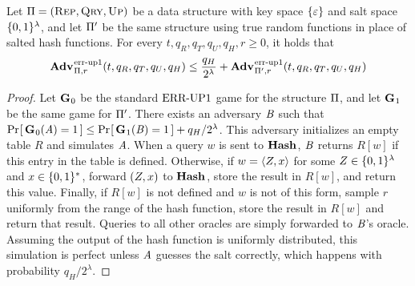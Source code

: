 \begin{lemma}\label{lemma:salttorand}
  Let $\mathrm{\Pi} = (\textsc{Rep}, \textsc{Qry}, \textsc{Up})$ be a data structure with key space $\{\varepsilon\}$ and salt space $\{0,1\}^\lambda$, and let $\mathrm{\Pi}'$ be the same structure using true random functions in place of salted hash functions. For every $t, q_R, q_T, q_U, q_H, r \geq 0$, it holds that
  \[
    \Adv{\errep1}_{\struct,r}(t, q_R, q_T, q_U, q_H) \leq \frac{q_H}{2^\lambda} + \Adv{\errep1}_{\struct',r}(t, q_R, q_T, q_U, q_H)
  \]
\end{lemma}

\begin{proof}
Let $\mathbf{G}\hspace{0.5pt}_0$ be the standard $\textnormal{ERR\mbox{-}UP}1$ game for the structure $\mathrm{\Pi}$, and
let $\mathbf{G}\hspace{0.5pt}_1$ be the same game for $\mathrm{\Pi}'$. There exists an adversary $\mathit{B}$
such that $\Pr\hspace{-1pt}\left[\,\mathbf{G}\hspace{0.5pt}_0(\mathit{A}) = 1\,\right] \le \Pr\hspace{-1pt}\left[\,\mathbf{G}\hspace{0.5pt}_1(\mathit{B}) = 1\,\right] + q_H/2^\lambda$.
This adversary initializes an empty table $R$ and simulates $\mathit{A}$. When a
query $w$ is sent to $\mathbf{Hash}\hspace{0.5pt}$, $\mathit{B}$ returns $R[w]$ if this entry in the table
is defined. Otherwise, if $w = \langle Z, x\rangle$ for some
$Z \in \{0,1\}^\lambda$ and $x \in \{0,1\}^*$, forward $(Z, x)$ to $\mathbf{Hash}\hspace{0.5pt}$,
store the result in $R[w]$, and return this value. Finally, if $R[w]$ is not
defined and $w$ is not of this form, sample $r$ uniformly from the range of the
hash function, store the result in $R[w]$ and return that result. Queries to all
other oracles are simply forwarded to $\mathit{B}$'s oracle. Assuming the output of
the hash function is uniformly distributed, this simulation is perfect unless
$\mathit{A}$ guesses the salt correctly, which happens with probability
$q_H/2^\lambda$.
\end{proof}

